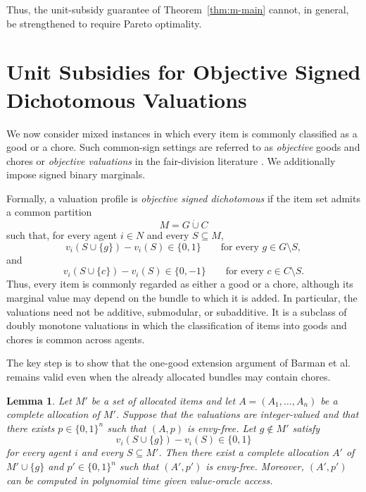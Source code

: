 \documentclass[11pt]{article}
\theoremstyle{plain}
\newtheorem{lemma}{Lemma}
\theoremstyle{plain}
\begin{document}
Thus, the unit-subsidy guarantee of Theorem~\ref{thm:m-main} cannot, in general, be strengthened to require Pareto optimality.


\section{Unit Subsidies for Objective Signed Dichotomous Valuations}
\label{sec:objective-mixed}

We now consider mixed instances in which every item is commonly classified as a good or a chore. Such common-sign settings are referred to as \emph{objective} goods and chores or \emph{objective valuations} in the fair-division literature \cite{aziz2022fair,bilo2026approximately}. We additionally impose signed binary marginals.

Formally, a valuation profile is \emph{objective signed dichotomous} if the item set admits a common partition
\[
M=G\mathbin{\dot\cup}C
\]such that, for every agent $i\in N$ and every $S\subseteq M$,
\[
v_i(S\cup\{g\})-v_i(S)\in\{0,1\}
\qquad
\text{for every }g\in G\setminus S,
\]
and
\[
v_i(S\cup\{c\})-v_i(S)\in\{0,-1\}
\qquad
\text{for every }c\in C\setminus S.
\]
Thus, every item is commonly regarded as either a good or a chore, although its marginal value may depend on the bundle to which it is added. In particular, the valuations need not be additive, submodular, or subadditive. It is a subclass of doubly monotone valuations in which the classification of items into goods and chores is common across agents.

The key step is to show that the one-good extension argument of Barman et al.~\cite{BKNS22} remains valid even when the already allocated bundles may contain chores.

\begin{lemma}
\label{lem:goods-extension}
Let $M'$ be a set of allocated items and let $A=(A_1,\ldots,A_n)$ be a complete allocation of $M'$. Suppose that the valuations are integer-valued and that there exists $p\in\{0,1\}^n$ such that $(A,p)$ is envy-free. Let $g\notin M'$
satisfy
\[
v_i(S\cup\{g\})-v_i(S)\in\{0,1\}
\]
for every agent $i$ and every $S\subseteq M'$. Then there exist a complete allocation $A'$ of $M'\cup\{g\}$ and $p'\in\{0,1\}^n$ such that $(A',p')$ is envy-free. Moreover, $(A',p')$ can be computed in polynomial time given value-oracle access.
\end{lemma}
\end{document}
